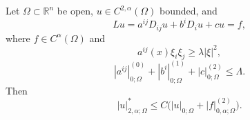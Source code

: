 \begin{theorem}
\label{gt-ch06-thm-6-2}

Let $\Omega\subset\mathbb R^n$ be open, $u\in C^{2,\alpha}(\Omega)$ bounded, and
\[
Lu=a^{ij}D_{ij}u+b^iD_i u+cu=f,
\]
where $f\in C^\alpha(\Omega)$ and
\begin{equation}\tag{6.12}
a^{ij}(x)\xi_i\xi_j\ge\lambda|\xi|^2,
\end{equation}
\begin{equation}\tag{6.13}
|a^{ij}|_{0;\Omega}^{(0)}+|b^i|_{0;\Omega}^{(1)}+|c|_{0;\Omega}^{(2)}\le\Lambda.
\end{equation}
Then
\begin{equation}\tag{6.14}
|u|_{2,\alpha;\Omega}^*\le C\bigl(|u|_{0;\Omega}+|f|_{0,\alpha;\Omega}^{(2)}\bigr).
\end{equation}
\end{theorem}
